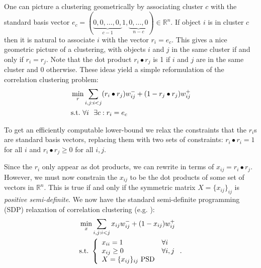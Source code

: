 \documentclass[11pt]{article}
\newcommand{\R}{\mathbb{R}}                     %
\newcommand{\dotp}{\bullet}
\begin{document}
One can picture a clustering geometrically by associating cluster $c$
with the standard basis vector $e_c =
(\underbrace{0,0,\ldots,0,}_{c-1}1,\underbrace{0,\ldots,0}_{n-c}) \in
\R^n$. If object $i$ is in cluster $c$ then it is natural to associate
$i$ with the vector $r_i=e_c$. This gives a nice geometric picture of
a clustering, with objects $i$ and $j$ in the same cluster if and only
if $r_i = r_j$. Note that the dot product $r_i \dotp r_j$ is 1 if $i$
and $j$ are in the same cluster and 0 otherwise. These ideas yield a
simple reformulation of the correlation clustering problem:
\begin{eqnarray*}
& \min_{r} \sum_{i,j:i<j} (r_i \dotp r_j)w^-_{ij} + (1 - r_j \dotp r_j) w^+_{ij} \\
& \hbox{s.t.~}
\forall i~~\exists c : r_i=e_c
\end{eqnarray*}

To get an efficiently computable lower-bound we relax the constraints
that the $r_i$s are standard basis vectors, replacing them with two
sets of constraints: $r_i \dotp r_i = 1$ for all $i$ and $r_i \dotp
r_j \geq 0$ for all $i,j$.


Since the $r_i$ only appear as dot products, we can rewrite in terms
of $x_{ij} = r_i \dotp r_j$. However, we must now constrain the
$x_{ij}$ to be the dot products of some set of vectors in $\R^n$. This
is true if and only if the symmetric matrix $X=\{x_{ij}\}_{ij}$ is
\emph{positive semi-definite}. We now have the standard semi-definite
programming (SDP) relaxation of correlation clustering
(e.g. \cite{Charikar05,Mathieu08a}):
\begin{eqnarray*}
& \min_{x} \sum_{i,j:i<j} x_{ij}w^-_{ij} + (1 - x_{ij})w^+_{ij} \\
& \hbox{s.t.~}\left\{
\begin{array}{ll} 
x_{ii} = 1 & \forall i \\
x_{ij} \geq 0 & \forall i,j \\
X=\{x_{ij}\}_{ij} \textrm{ PSD} &
\end{array}\right.
.\end{eqnarray*}
\end{document}
